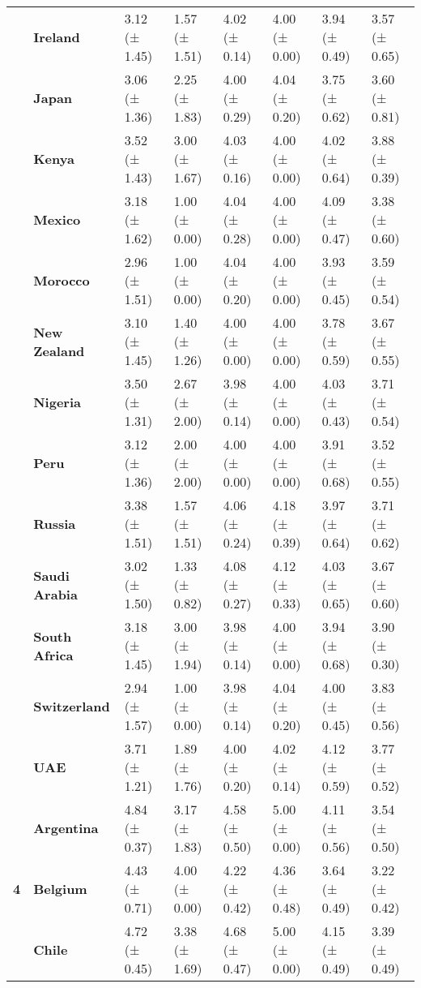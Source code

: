 \begin{longtable}{llllllll}
\textbf{} & \textbf{Ireland} & 3.12 (± 1.45) & 1.57 (± 1.51) & 4.02 (± 0.14) & 4.00 (± 0.00) & 3.94 (± 0.49) & 3.57 (± 0.65) \\
\textbf{} & \textbf{Japan} & 3.06 (± 1.36) & 2.25 (± 1.83) & 4.00 (± 0.29) & 4.04 (± 0.20) & 3.75 (± 0.62) & 3.60 (± 0.81) \\
\textbf{} & \textbf{Kenya} & 3.52 (± 1.43) & 3.00 (± 1.67) & 4.03 (± 0.16) & 4.00 (± 0.00) & 4.02 (± 0.64) & 3.88 (± 0.39) \\
\textbf{} & \textbf{Mexico} & 3.18 (± 1.62) & 1.00 (± 0.00) & 4.04 (± 0.28) & 4.00 (± 0.00) & 4.09 (± 0.47) & 3.38 (± 0.60) \\
\textbf{} & \textbf{Morocco} & 2.96 (± 1.51) & 1.00 (± 0.00) & 4.04 (± 0.20) & 4.00 (± 0.00) & 3.93 (± 0.45) & 3.59 (± 0.54) \\
\textbf{} & \textbf{New Zealand} & 3.10 (± 1.45) & 1.40 (± 1.26) & 4.00 (± 0.00) & 4.00 (± 0.00) & 3.78 (± 0.59) & 3.67 (± 0.55) \\
\textbf{} & \textbf{Nigeria} & 3.50 (± 1.31) & 2.67 (± 2.00) & 3.98 (± 0.14) & 4.00 (± 0.00) & 4.03 (± 0.43) & 3.71 (± 0.54) \\
\textbf{} & \textbf{Peru} & 3.12 (± 1.36) & 2.00 (± 2.00) & 4.00 (± 0.00) & 4.00 (± 0.00) & 3.91 (± 0.68) & 3.52 (± 0.55) \\
\textbf{} & \textbf{Russia} & 3.38 (± 1.51) & 1.57 (± 1.51) & 4.06 (± 0.24) & 4.18 (± 0.39) & 3.97 (± 0.64) & 3.71 (± 0.62) \\
\textbf{} & \textbf{Saudi Arabia} & 3.02 (± 1.50) & 1.33 (± 0.82) & 4.08 (± 0.27) & 4.12 (± 0.33) & 4.03 (± 0.65) & 3.67 (± 0.60) \\
\textbf{} & \textbf{South Africa} & 3.18 (± 1.45) & 3.00 (± 1.94) & 3.98 (± 0.14) & 4.00 (± 0.00) & 3.94 (± 0.68) & 3.90 (± 0.30) \\
\textbf{} & \textbf{Switzerland} & 2.94 (± 1.57) & 1.00 (± 0.00) & 3.98 (± 0.14) & 4.04 (± 0.20) & 4.00 (± 0.45) & 3.83 (± 0.56) \\
\textbf{} & \textbf{UAE} & 3.71 (± 1.21) & 1.89 (± 1.76) & 4.00 (± 0.20) & 4.02 (± 0.14) & 4.12 (± 0.59) & 3.77 (± 0.52) \\
\cline{1-8}
\multirow[t]{19}{*}{\textbf{4}} & \textbf{Argentina} & 4.84 (± 0.37) & 3.17 (± 1.83) & 4.58 (± 0.50) & 5.00 (± 0.00) & 4.11 (± 0.56) & 3.54 (± 0.50) \\
\textbf{} & \textbf{Belgium} & 4.43 (± 0.71) & 4.00 (± 0.00) & 4.22 (± 0.42) & 4.36 (± 0.48) & 3.64 (± 0.49) & 3.22 (± 0.42) \\
\textbf{} & \textbf{Chile} & 4.72 (± 0.45) & 3.38 (± 1.69) & 4.68 (± 0.47) & 5.00 (± 0.00) & 4.15 (± 0.49) & 3.39 (± 0.49) \\

\end{longtable}
